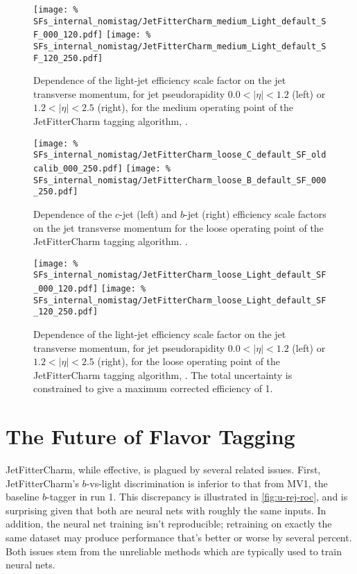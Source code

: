 \begin{figure}
  \centering
    \texttt{[image: \%
SFs\_internal\_nomistag/JetFitterCharm\_medium\_Light\_default\_SF\_000\_120.pdf]}
  \texttt{[image: \%
SFs\_internal\_nomistag/JetFitterCharm\_medium\_Light\_default\_SF\_120\_250.pdf]}
  \caption{Dependence of the light-jet efficiency scale factor on the jet transverse momentum, for jet pseudorapidity $0.0 < | \eta | < 1.2$ (left) or 
    $1.2 < | \eta | < 2.5$ (right), for the medium operating point of the  JetFitterCharm tagging algorithm, \lSF.}
  \label{JFC_SF_L1}
\end{figure}


\begin{figure}
  \centering
  \texttt{[image: \%
SFs\_internal\_nomistag/JetFitterCharm\_loose\_C\_default\_SF\_oldcalib\_000\_250.pdf]}
  \texttt{[image: \%
SFs\_internal\_nomistag/JetFitterCharm\_loose\_B\_default\_SF\_000\_250.pdf]}
  \caption{Dependence of the $c$-jet (left) and $b$-jet (right) efficiency scale factors on the jet transverse momentum for the loose operating point of the 
    JetFitterCharm tagging algorithm. \bcSF.}
  \label{JFC_SF_B_loose}
\end{figure}

\begin{figure}
  \centering
  \texttt{[image: \%
SFs\_internal\_nomistag/JetFitterCharm\_loose\_Light\_default\_SF\_000\_120.pdf]}
  \texttt{[image: \%
SFs\_internal\_nomistag/JetFitterCharm\_loose\_Light\_default\_SF\_120\_250.pdf]}
  \caption{Dependence of the light-jet efficiency scale factor on the jet transverse momentum, for jet pseudorapidity $0.0 < | \eta | < 1.2$ (left) or 
    $1.2 < | \eta | < 2.5$ (right), for the loose operating point of the JetFitterCharm tagging algorithm, \lSF. The total uncertainty is constrained to give a maximum corrected efficiency of 1.}
  \label{JFC_SF_L1_loose}
\end{figure}

\clearpage



\section{The Future of Flavor Tagging}
JetFitterCharm, while effective, is plagued by several related issues.
First, JetFitterCharm's $b$-vs-light discrimination is inferior to that from MV1, the baseline $b$-tagger in run 1. This discrepancy is illustrated in \cref{fig:u-rej-roc}, and is surprising given that both are neural nets with roughly the same inputs.
In addition, the neural net training isn't reproducible; retraining on exactly the same dataset may produce performance that's better or worse by several percent.
Both issues stem from the unreliable methods which are typically used to train neural nets.

